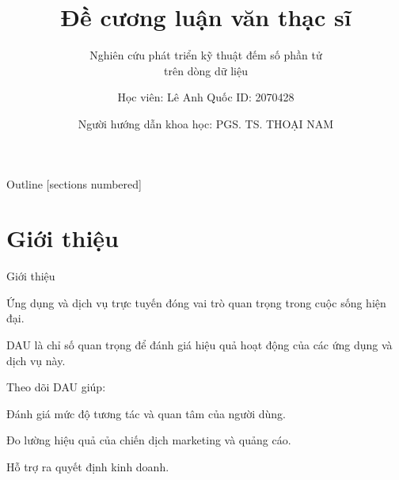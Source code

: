\documentclass[10pt]{beamer}
\title{Đề cương luận văn thạc sĩ}
\subtitle{Nghiên cứu phát triển kỹ thuật đếm số phần tử \\ \hspace{2.4cm} trên dòng dữ liệu}
\date{Người hướng dẫn khoa học: \hspace{0.5cm}PGS. TS. THOẠI NAM}
\author{Học viên: Lê Anh Quốc \hspace{1cm} ID: 2070428}
\newcommand{\SubItem}[1]{
    {\setlength\itemindent{15pt} \item[-] #1}
}
\begin{document}
\maketitle

\begin{frame}{Outline}
  [sections numbered]
  \tableofcontents[hideallsubsections]
\end{frame}

\section{Giới thiệu}

\begin{frame}[fragile]{Giới thiệu}
\begin{itemize}
  \item Ứng dụng và dịch vụ trực tuyến đóng vai trò quan trọng trong cuộc sống hiện đại.
  \item DAU là chỉ số quan trọng để đánh giá hiệu quả hoạt động của các ứng dụng và dịch vụ này.
  \item Theo dõi DAU giúp:
  \SubItem{Đánh giá mức độ tương tác và quan tâm của người dùng.}
  \SubItem{Đo lường hiệu quả của chiến dịch marketing và quảng cáo.}
  \SubItem{Hỗ trợ ra quyết định kinh doanh.}
\end{itemize}
\end{frame}
\end{document}
